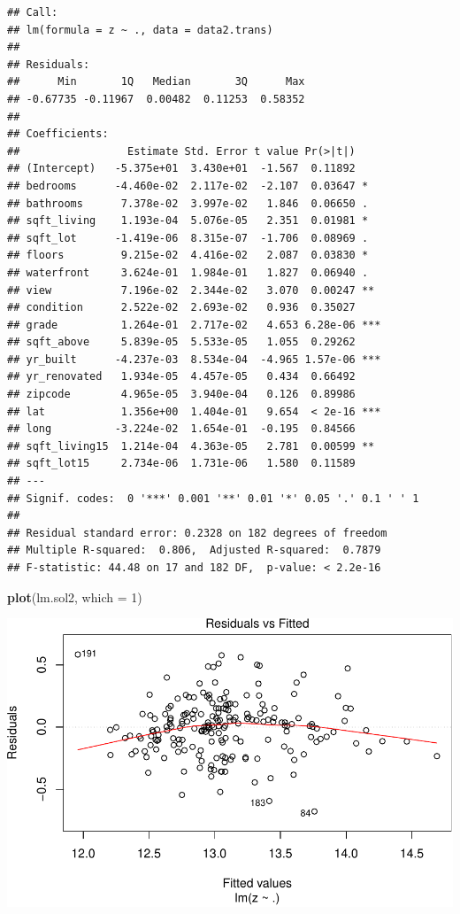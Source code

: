 \documentclass[]{article}
\newenvironment{Shaded}{\begin{snugshade}}{\end{snugshade}}
\newcommand{\KeywordTok}[1]{\textcolor[rgb]{0.13,0.29,0.53}{\textbf{#1}}}
\newcommand{\DataTypeTok}[1]{\textcolor[rgb]{0.13,0.29,0.53}{#1}}
\newcommand{\DecValTok}[1]{\textcolor[rgb]{0.00,0.00,0.81}{#1}}
\newcommand{\NormalTok}[1]{#1}
\begin{document}
\begin{verbatim}
## Call:
## lm(formula = z ~ ., data = data2.trans)
## 
## Residuals:
##      Min       1Q   Median       3Q      Max 
## -0.67735 -0.11967  0.00482  0.11253  0.58352 
## 
## Coefficients:
##                 Estimate Std. Error t value Pr(>|t|)    
## (Intercept)   -5.375e+01  3.430e+01  -1.567  0.11892    
## bedrooms      -4.460e-02  2.117e-02  -2.107  0.03647 *  
## bathrooms      7.378e-02  3.997e-02   1.846  0.06650 .  
## sqft_living    1.193e-04  5.076e-05   2.351  0.01981 *  
## sqft_lot      -1.419e-06  8.315e-07  -1.706  0.08969 .  
## floors         9.215e-02  4.416e-02   2.087  0.03830 *  
## waterfront     3.624e-01  1.984e-01   1.827  0.06940 .  
## view           7.196e-02  2.344e-02   3.070  0.00247 ** 
## condition      2.522e-02  2.693e-02   0.936  0.35027    
## grade          1.264e-01  2.717e-02   4.653 6.28e-06 ***
## sqft_above     5.839e-05  5.533e-05   1.055  0.29262    
## yr_built      -4.237e-03  8.534e-04  -4.965 1.57e-06 ***
## yr_renovated   1.934e-05  4.457e-05   0.434  0.66492    
## zipcode        4.965e-05  3.940e-04   0.126  0.89986    
## lat            1.356e+00  1.404e-01   9.654  < 2e-16 ***
## long          -3.224e-02  1.654e-01  -0.195  0.84566    
## sqft_living15  1.214e-04  4.363e-05   2.781  0.00599 ** 
## sqft_lot15     2.734e-06  1.731e-06   1.580  0.11589    
## ---
## Signif. codes:  0 '***' 0.001 '**' 0.01 '*' 0.05 '.' 0.1 ' ' 1
## 
## Residual standard error: 0.2328 on 182 degrees of freedom
## Multiple R-squared:  0.806,  Adjusted R-squared:  0.7879 
## F-statistic: 44.48 on 17 and 182 DF,  p-value: < 2.2e-16
\end{verbatim}

\begin{Shaded}
\begin{Highlighting}[]
\KeywordTok{plot}\NormalTok{(lm.sol2, }\DataTypeTok{which =} \DecValTok{1}\NormalTok{)}
\end{Highlighting}
\end{Shaded}

\includegraphics{FinalProjectForRegressionAnalysis_files/figure-latex/unnamed-chunk-10-1.pdf}
\end{document}

